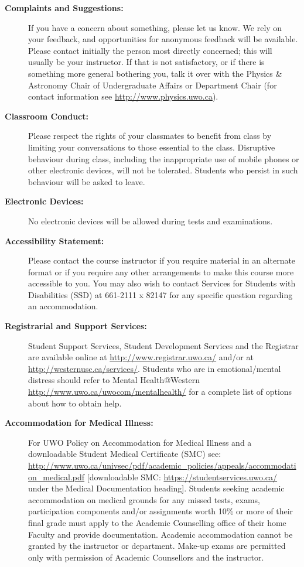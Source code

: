 \documentclass[12pt]{article}
\begin{document}
\begin{description}
\item[\bf Complaints and Suggestions:]
If you have a concern about something, please let us know. We rely on your feedback, and opportunities for anonymous feedback will be available. Please contact initially the person most directly concerned; this will usually be your instructor. If that is not satisfactory, or if there is something more general bothering you, talk it over with the Physics \& Astronomy Chair of Undergraduate Affairs or Department Chair (for contact information see \url{http://www.physics.uwo.ca}).

\item[\bf Classroom Conduct:]
Please respect the rights of your classmates to benefit from class by limiting your conversations to those essential to the class. 
Disruptive behaviour during class, including the inappropriate use of mobile phones or other electronic devices, will not be tolerated. 
Students who persist in such behaviour will be asked to leave.

\item[\bf Electronic Devices:] No electronic devices will be allowed during tests and examinations.

\item[\bf Accessibility Statement:] Please contact the course instructor if you require material in an alternate format or if you require any other arrangements to make this course more accessible to you. You may also wish to contact Services for Students with Disabilities (SSD) at 661-2111 x 82147 for any specific question regarding an accommodation.

\item[\bf Registrarial and Support Services:] Student Support Services, Student Development Services and the Registrar are available online at 
\url{http://www.registrar.uwo.ca/} and/or at \url{http://westernusc.ca/services/}. Students who are in emotional/mental distress should refer to Mental Health@Western 
\url{http://www.uwo.ca/uwocom/mentalhealth/} for a complete list of options about how to obtain help.

\item[\bf Accommodation for Medical Illness:] For UWO Policy on Accommodation for Medical Illness and a downloadable 
 Student Medical Certificate (SMC) see:
\url{http://www.uwo.ca/univsec/pdf/academic_policies/appeals/accommodation_medical.pdf}
[downloadable SMC: \url{https://studentservices.uwo.ca/} under the Medical Documentation heading].
Students seeking academic accommodation on medical grounds for any missed tests, exams,
participation components and/or assignments worth 10\% or more of their final grade must apply to
the Academic Counselling office of their home Faculty and provide documentation. Academic
accommodation cannot be granted by the instructor or department. Make-up exams are permitted
only with permission of Academic Counsellors and the instructor.


\end{description}
\end{document}
